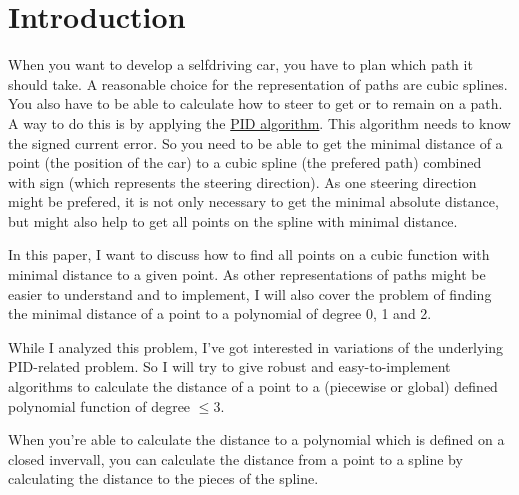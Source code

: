 \chapter*{Introduction}
When you want to develop a selfdriving car, you have to plan which path
it should take. A reasonable choice for the representation of
paths are cubic splines. You also have to be able to calculate
how to steer to get or to remain on a path. A way to do this
is by applying the \href{https://en.wikipedia.org/wiki/PID_algorithm}{PID algorithm}.
This algorithm needs to know the signed current error. So you need to
be able to get the minimal distance of a point (the position of the car)
to a cubic spline (the prefered path)
combined with sign (which represents the steering direction).
As one steering direction might be prefered, it is not only necessary to
get the minimal absolute distance, but might also help to get all points
on the spline with minimal distance.

In this paper, I want to discuss how to find all points on a cubic
function with minimal distance to a given point.
As other representations of paths might be easier to understand and
to implement, I will also cover the problem of finding the minimal
distance of a point to a polynomial of degree 0, 1 and 2.

While I analyzed this problem, I've got interested in variations
of the underlying PID-related problem. So I will try to give
robust and easy-to-implement algorithms to calculate the distance
of a point to a (piecewise or global) defined polynomial function
of degree $\leq 3$.

When you're able to calculate the distance to a polynomial which is
defined on a closed invervall, you can calculate the distance from
a point to a spline by calculating the distance to the pieces of the
spline.
